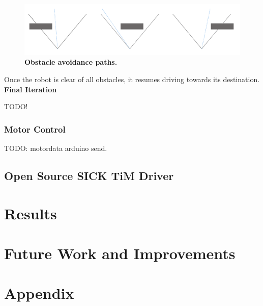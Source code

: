 \documentclass[titlepage,12pt,a4paper]{article}
\begin{document}
\begin{figure}[h]
	\centering
	\includegraphics[scale=0.17]{obstacle2.png}
	\caption{\textbf{Obstacle avoidance paths.}}
\end{figure}

Once the robot is clear of all obstacles, it resumes driving towards its destination. \\

\textbf{Final Iteration}

TODO!




\subsubsection{Motor Control}

TODO: motordata arduino send. 

\subsection{Open Source SICK TiM Driver}

\pagebreak
\section{Results}

\pagebreak
\section{Future Work and Improvements}

\pagebreak
\section{Appendix}
\end{document}

